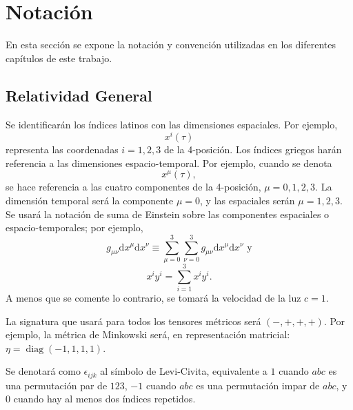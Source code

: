 \chapter*{Notación}
En esta sección se expone la notación y convención utilizadas en los diferentes capítulos de este trabajo.
\section*{Relatividad General}
	Se identificarán los índices latinos con las dimensiones espaciales. Por ejemplo,
	$$x^i(\tau)$$
	representa las coordenadas $i=1,2,3$ de la 4-posición. Los índices griegos harán referencia a las dimensiones espacio-temporal. Por ejemplo, cuando se denota
	$$x^\mu(\tau),$$
	se hace referencia a las cuatro componentes de la 4-posición, $\mu=0,1,2,3$. La dimensión temporal será la componente $\mu=0$, y las espaciales serán $\mu=1,2,3$. Se usará la notación de suma de Einstein sobre las componentes espaciales o espacio-temporales; por ejemplo,
	$$g_{\mu\nu}\mathrm{d}x^\mu \mathrm{d}x^\nu\equiv \sum_{\mu=0}^3 \sum_{\nu=0}^3 g_{\mu\nu}\mathrm{d}x^\mu \mathrm{d}x^\nu \text{ y}$$
	$$x^iy^i=\sum_{i=1}^3 x^iy^i.$$
	A menos que se comente lo contrario, se tomará la velocidad de la luz $c=1$.
	
	La signatura que usará para todos los tensores métricos será $(-,+,+,+)$. Por ejemplo, la métrica de Minkowski será, en representación matricial: $\eta=\mathop{diag}(-1,1,1,1)$.
	
	Se denotará como $\epsilon_{ijk}$ al símbolo de Levi-Civita, equivalente a $1$ cuando $abc$ es una permutación par de $123$, $-1$ cuando $abc$ es una permutación impar de $abc$, y $0$ cuando hay al menos dos índices repetidos.